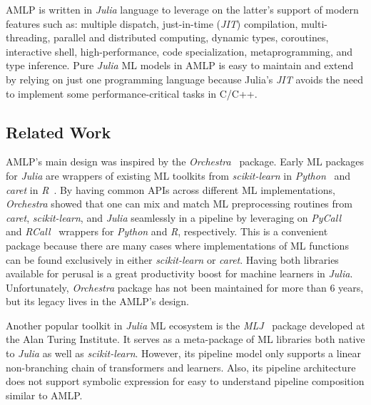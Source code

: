 \documentclass{juliacon}
\begin{document}
AMLP is written in \emph{Julia} language \cite{bezanson2017julia} to leverage on the
latter's support of modern features such as: multiple dispatch, just-in-time
(\emph{JIT}) compilation, multi-threading, parallel and distributed computing,
dynamic types, coroutines, interactive shell, high-performance, code specialization,
metaprogramming, and type inference.  Pure \emph{Julia} ML models in AMLP is
easy to maintain and extend by relying on just one programming language
because Julia's \emph{JIT} avoids the need to implement some
performance-critical tasks in C/C++.

\subsection{Related Work}
\label{relatedwork}

AMLP's main design was inspired by the
\emph{Orchestra}~\cite{orchestra2014} package.  Early ML packages for
\emph{Julia} are wrappers of existing ML toolkits from \emph{scikit-learn}  in
\emph{Python}~\cite{python95} and \emph{caret} in \emph{R}~\cite{r13}.  By
having common APIs across different ML implementations, \emph{Orchestra} showed
that one can mix and match ML preprocessing routines from \emph{caret},
\emph{scikit-learn}, and \emph{Julia} seamlessly in a pipeline by leveraging on
\emph{PyCall}~\cite{pycall} and \emph{RCall}~\cite{rcall} wrappers for
\emph{Python} and \emph{R}, respectively. This is a convenient package
because there are many cases where implementations of ML functions can be found
exclusively in either \emph{scikit-learn} or \emph{caret}.  Having both
libraries available for perusal is a great productivity boost for machine
learners in \emph{Julia}. Unfortunately, \emph{Orchestra} package has not been
maintained for more than 6 years, but its legacy lives in the AMLP's
design.

\vskip 6pt

Another popular toolkit in \emph{Julia} ML ecosystem is the
\emph{MLJ}~\cite{anthony_blaom_2019_3541506} package developed at the Alan Turing
Institute. It serves as a meta-package of ML libraries both native to \emph{Julia} as
well as \emph{scikit-learn}. However, its pipeline model only supports a
linear non-branching chain of transformers and learners. Also, its pipeline
architecture does not support symbolic expression for easy to understand
pipeline composition similar to AMLP.

\vskip 6pt
\end{document}
